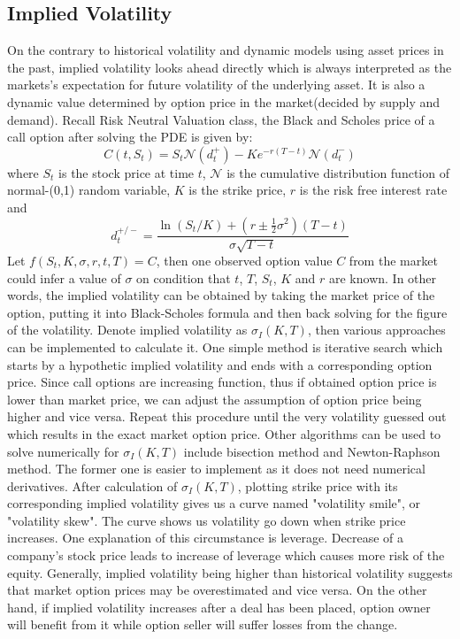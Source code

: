 \subsection{Implied Volatility}
On the contrary to historical volatility and dynamic models using asset prices in the past, implied volatility looks ahead directly which is always interpreted as the markets's expectation for future volatility of the underlying asset. It is also a dynamic value determined by option price in the market(decided by supply and demand). Recall Risk Neutral Valuation class, the Black and Scholes price of a call option after solving the PDE is given by:
\begin{equation}
C(t,S_t)=S_t\mathcal{N}(d_t^+)-Ke^{-r(T-t)}\mathcal{N}(d_t^-)
\end{equation} 
where $S_t$ is the stock price at time $t$, $\mathcal{N}$ is the cumulative distribution function of normal-(0,1) random variable, $K$ is the strike price, $r$ is the risk free interest rate and 
\begin{equation}
d_t^{+/-}=\frac{\ln(S_t/K)+(r\pm\frac{1}{2}\sigma^2)(T-t)}{\sigma\sqrt{T-t}} \nonumber
\end{equation} 
Let $f(S_t,K,\sigma,r,t,T)=C$, then one observed option value $C$ from the market could infer a value of $\sigma$ on condition that $t$, $T$, $S_t$, $K$ and $r$ are known. In other words, the implied volatility can be obtained by taking the market price of the option, putting it into Black-Scholes formula and then back solving for the figure of the volatility. 
Denote implied volatility as $\sigma_I(K,T)$, then various approaches can be implemented to calculate it. One simple method is iterative search which starts by a hypothetic implied volatility and ends with a corresponding option price. Since call options are increasing function, thus if obtained option price is lower than market price, we can adjust the assumption of option price being higher and vice versa. Repeat this procedure until the very volatility guessed out which results in the exact market option price. Other algorithms can be used to solve numerically for $\sigma_I(K,T)$ include bisection method and Newton-Raphson method. The former one is easier to implement as it does not need numerical derivatives. After calculation of $\sigma_I(K,T)$, plotting strike price with its corresponding implied volatility gives us a curve named "volatility smile", or "volatility skew". The curve shows us volatility go down when strike price increases. One explanation of this circumstance is leverage. Decrease of a company's stock price leads to increase of leverage which causes more risk of the equity. Generally, implied volatility being higher than historical volatility suggests that market option prices may be overestimated and vice versa. On the other hand, if implied volatility increases after a deal has been placed, option owner will benefit from it while option seller will suffer losses from the change. 
